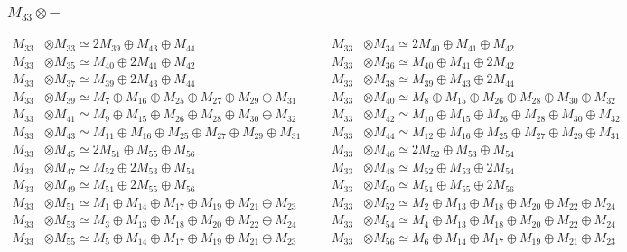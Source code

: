 \subsubsection{$ M_{33}\otimes -$}
\begin{align*}
M_{33} &\otimes M_{33} \simeq 2M_{39} \oplus M_{43} \oplus M_{44} &&& M_{33} &\otimes M_{34} \simeq 2M_{40} \oplus M_{41} \oplus M_{42}\\
M_{33} &\otimes M_{35} \simeq M_{40} \oplus 2M_{41} \oplus M_{42} &&& M_{33} &\otimes M_{36} \simeq M_{40} \oplus M_{41} \oplus 2M_{42}\\
M_{33} &\otimes M_{37} \simeq M_{39} \oplus 2M_{43} \oplus M_{44} &&& M_{33} &\otimes M_{38} \simeq M_{39} \oplus M_{43} \oplus 2M_{44}\\
M_{33} &\otimes M_{39} \simeq M_{7} \oplus M_{16} \oplus M_{25} \oplus M_{27} \oplus M_{29} \oplus M_{31} &&& M_{33} &\otimes M_{40} \simeq M_{8} \oplus M_{15} \oplus M_{26} \oplus M_{28} \oplus M_{30} \oplus M_{32}\\
M_{33} &\otimes M_{41} \simeq M_{9} \oplus M_{15} \oplus M_{26} \oplus M_{28} \oplus M_{30} \oplus M_{32} &&& M_{33} &\otimes M_{42} \simeq M_{10} \oplus M_{15} \oplus M_{26} \oplus M_{28} \oplus M_{30} \oplus M_{32}\\
M_{33} &\otimes M_{43} \simeq M_{11} \oplus M_{16} \oplus M_{25} \oplus M_{27} \oplus M_{29} \oplus M_{31} &&& M_{33} &\otimes M_{44} \simeq M_{12} \oplus M_{16} \oplus M_{25} \oplus M_{27} \oplus M_{29} \oplus M_{31}\\
M_{33} &\otimes M_{45} \simeq 2M_{51} \oplus M_{55} \oplus M_{56} &&& M_{33} &\otimes M_{46} \simeq 2M_{52} \oplus M_{53} \oplus M_{54}\\
M_{33} &\otimes M_{47} \simeq M_{52} \oplus 2M_{53} \oplus M_{54} &&& M_{33} &\otimes M_{48} \simeq M_{52} \oplus M_{53} \oplus 2M_{54}\\
M_{33} &\otimes M_{49} \simeq M_{51} \oplus 2M_{55} \oplus M_{56} &&& M_{33} &\otimes M_{50} \simeq M_{51} \oplus M_{55} \oplus 2M_{56}\\
M_{33} &\otimes M_{51} \simeq M_{1} \oplus M_{14} \oplus M_{17} \oplus M_{19} \oplus M_{21} \oplus M_{23} &&& M_{33} &\otimes M_{52} \simeq M_{2} \oplus M_{13} \oplus M_{18} \oplus M_{20} \oplus M_{22} \oplus M_{24}\\
M_{33} &\otimes M_{53} \simeq M_{3} \oplus M_{13} \oplus M_{18} \oplus M_{20} \oplus M_{22} \oplus M_{24} &&& M_{33} &\otimes M_{54} \simeq M_{4} \oplus M_{13} \oplus M_{18} \oplus M_{20} \oplus M_{22} \oplus M_{24}\\
M_{33} &\otimes M_{55} \simeq M_{5} \oplus M_{14} \oplus M_{17} \oplus M_{19} \oplus M_{21} \oplus M_{23} &&& M_{33} &\otimes M_{56} \simeq M_{6} \oplus M_{14} \oplus M_{17} \oplus M_{19} \oplus M_{21} \oplus M_{23}\\
\end{align*}

